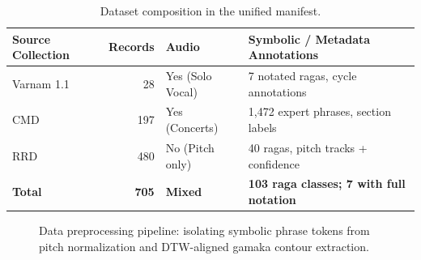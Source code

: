 \documentclass[12pt,a4paper]{report}
\begin{document}
\begin{table}[h!]
\centering
\caption{Dataset composition in the unified manifest.}
\label{tab:dataset}
\vspace{0.5em}
\footnotesize
\begin{tabular}{@{}lrlp{}@{}}
\toprule
\textbf{Source Collection} & \textbf{Records} & \textbf{Audio} & \textbf{Symbolic / Metadata Annotations} \\
\midrule
Varnam 1.1 & 28 & Yes (Solo Vocal) & 7 notated ragas, cycle annotations \\
CMD & 197 & Yes (Concerts) & 1,472 expert phrases, section labels \\
RRD & 480 & No (Pitch only) & 40 ragas, pitch tracks + confidence \\
\midrule
\textbf{Total} & \textbf{705} & \textbf{Mixed} & \textbf{103 raga classes; 7 with full notation} \\
\bottomrule
\end{tabular}
\end{table}

\begin{figure}[h!]
\centering
{}
\caption{Data preprocessing pipeline: isolating symbolic phrase tokens from pitch normalization and DTW-aligned gamaka contour extraction.}
\label{fig:dtw_pipeline}
\end{figure}
\end{document}
